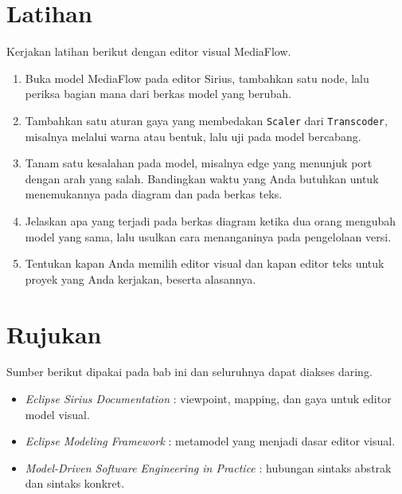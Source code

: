 \section{Latihan}

Kerjakan latihan berikut dengan editor visual MediaFlow.

\begin{enumerate}
  \item Buka model MediaFlow pada editor Sirius, tambahkan satu node, lalu periksa bagian mana dari berkas model yang berubah.
  \item Tambahkan satu aturan gaya yang membedakan \texttt{Scaler} dari \texttt{Transcoder}, misalnya melalui warna atau bentuk, lalu uji pada model bercabang.
  \item Tanam satu kesalahan pada model, misalnya edge yang menunjuk port dengan arah yang salah. Bandingkan waktu yang Anda butuhkan untuk menemukannya pada diagram dan pada berkas teks.
  \item Jelaskan apa yang terjadi pada berkas diagram ketika dua orang mengubah model yang sama, lalu usulkan cara menanganinya pada pengelolaan versi.
  \item Tentukan kapan Anda memilih editor visual dan kapan editor teks untuk proyek yang Anda kerjakan, beserta alasannya.
\end{enumerate}

\section{Rujukan}

Sumber berikut dipakai pada bab ini dan seluruhnya dapat diakses daring.

\begin{itemize}
  \item \textit{Eclipse Sirius Documentation} \cite{doc-sirius}: viewpoint, mapping, dan gaya untuk editor model visual.
  \item \textit{Eclipse Modeling Framework} \cite{doc-emf}: metamodel yang menjadi dasar editor visual.
  \item \textit{Model-Driven Software Engineering in Practice} \cite{brambilla2017mdse}: hubungan sintaks abstrak dan sintaks konkret.
\end{itemize}
